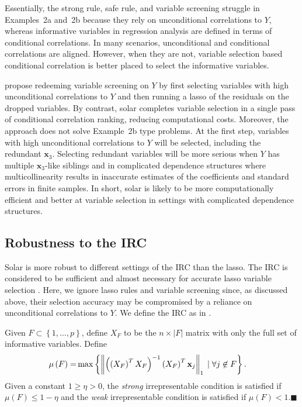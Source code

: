 \documentclass[11pt,review,authoryear]{elsarticle}
\begin{document}
\bigskip
Essentially, the strong rule, safe rule, and variable screening struggle in Examples~2a and~2b because they rely on unconditional correlations to $Y$, whereas informative variables in regression analysis are defined in terms of conditional correlations. In many scenarios, unconditional and conditional correlations are aligned. However, when they are not, variable selection based conditional correlation is better placed to select the informative variables.

\citet{fan2008sure} propose redeeming variable screening on $Y$ by first selecting variables with high unconditional correlations to $Y$ and then running a lasso of the residuals on the dropped variables. By contrast, solar completes variable selection in a single pass of conditional correlation ranking, reducing computational costs. Moreover, the \citet{fan2008sure} approach does not solve Example~2b type problems. At the first step, variables with high unconditional correlations to $Y$ will be selected, including the redundant $\mathbf{x}_3$. Selecting redundant variables will be more serious when $Y$ has multiple $\mathbf{x}_3$-like siblings and in complicated dependence structures where multicollinearity results in inaccurate estimates of the coefficients and standard errors in finite samples. In short, solar is likely to be more computationally efficient and better at variable selection in settings with complicated dependence structures.


\subsection{Robustness to the IRC \label{subsection:irc}}

Solar is more robust to different settings of the IRC than the lasso. The IRC is considered to be sufficient and almost necessary for accurate lasso variable selection \citep{zhang09}. Here, we ignore lasso rules and variable screening since, as discussed above, their selection accuracy may be compromised by a reliance on unconditional correlations to $Y$. We define the IRC as in \citet{zhang09}.

\begin{definition}[IRC]
  Given $F \subset \left\{ 1, \ldots, p \right\}$, define $X_F$ to be the $n \times \left\vert F \right \vert$ matrix with only the full set of informative variables. Define
    \begin{align}
    \mu \left( F \right) = & \max \left\{ \left\Vert \left( \left( X_F \right)^T X_F \right)^{-1} \left( X_F \right)^T \mathbf{x}_j \right\Vert_1 \; \vert \; \forall j \not\in F \right\}. \notag
    \end{align}
  Given a constant $1 \geqslant \eta > 0$, the \emph{strong} irrepresentable condition is satisfied if $\mu \left( F \right) \leqslant 1 - \eta$ and the \emph{weak} irrepresentable condition is satisfied if $\mu \left( F \right) < 1$.$\blacksquare$
\end{definition}
\end{document}
